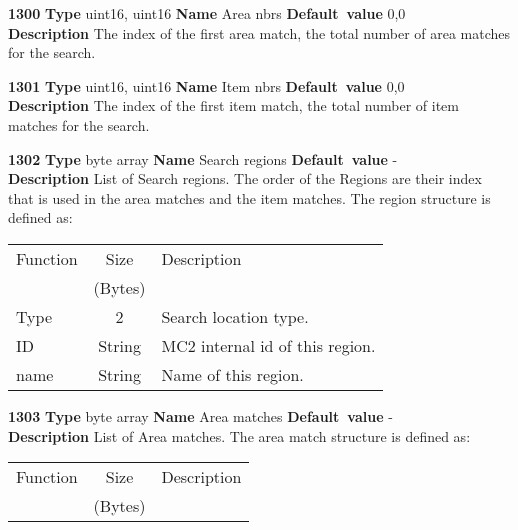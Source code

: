 \documentclass[a4paper]{article}
\begin{document}
\begin{list}{\textbf{ParamID}}{}
\item \textbf{1300} \textbf{Type} uint16, uint16 \textbf{Name} Area nbrs
                 \textbf{Default~value} 0,0 \\
  \label{Area nbrs}
  \textbf{Description} The index of the first area match, the total number
  of area matches for the search.
\item \textbf{1301} \textbf{Type} uint16, uint16 \textbf{Name} Item nbrs
                 \textbf{Default~value} 0,0 \\
  \label{Item nbrs}
  \textbf{Description} The index of the first item match, the total number
  of item matches for the search.
\item \textbf{1302} \textbf{Type} byte array \textbf{Name} Search regions
                 \textbf{Default~value} - \\
  \label{Search regions}
  \textbf{Description} List of Search regions. The order of the Regions are
  their index that is used in the area matches and the item matches. 
  The region structure is defined as:\\
  \begin{tabular}{|l|c|p{7cm}|}
    \hline
    Function    & Size    & Description \\
                & (Bytes) & \\\hline
    Type        & 2       & Search location type. \\\hline
    ID          & String  & MC2 internal id of this region.\\\hline
    name        & String  & Name of this region. \\\hline
  \end{tabular}
\item \textbf{1303} \textbf{Type} byte array  \textbf{Name} Area matches
                 \textbf{Default~value} - \\
  \label{Area matches}
  \textbf{Description} List of Area matches. The area match structure is
  defined as:\\
  \begin{tabular}{|l|c|p{7cm}|}
    \hline
    Function    & Size    & Description \\
                & (Bytes) &             \\\hline

\end{tabular}
\end{list}
\end{document}
